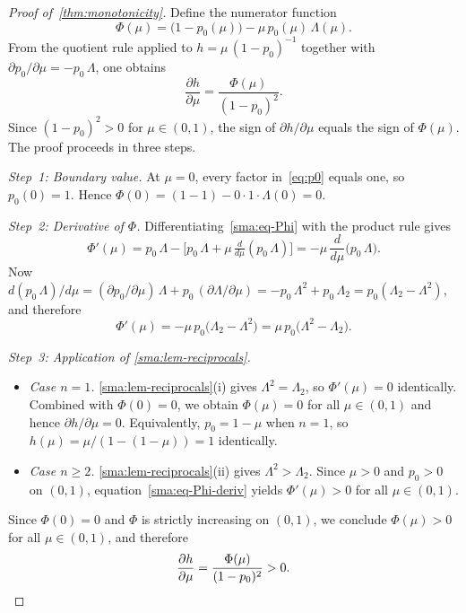 \begin{proof}[Proof of~\cref{thm:monotonicity}]
  Define the numerator function
  \begin{equation}\label{sma:eq-Phi}
    \Phi(\mu)
    = \bigl(1 - p_0(\mu)\bigr) - \mu\, p_0(\mu)\,\Lambda(\mu).
  \end{equation}
  From the quotient rule applied to $h = \mu\,(1-p_0)^{-1}$ together with
  $\partial p_0 / \partial\mu = -p_0\, \Lambda$, one obtains
  \begin{equation}\label{sma:eq-dh-numerator}
    \frac{\partial h}{\partial \mu}
    = \frac{\Phi(\mu)}{(1 - p_0)^2}.
  \end{equation}
  Since $(1 - p_0)^2 > 0$ for $\mu \in (0,1)$, the sign of
  $\partial h / \partial\mu$ equals the sign of $\Phi(\mu)$.  The proof
  proceeds in three steps.

  \medskip\noindent\textit{Step~1: Boundary value.}\enspace
  At $\mu = 0$, every factor in~\eqref{eq:p0} equals one, so $p_0(0) = 1$.
  Hence $\Phi(0) = (1 - 1) - 0 \cdot 1 \cdot \Lambda(0) = 0$.

  \medskip\noindent\textit{Step~2: Derivative of\/ $\Phi$.}\enspace
  Differentiating~\eqref{sma:eq-Phi} with the product rule gives
  \[
    \Phi'(\mu)
    = p_0\,\Lambda
      - \bigl[p_0\,\Lambda
        + \mu\,\tfrac{d}{d\mu}(p_0\,\Lambda)\bigr]
    = -\mu\,\frac{d}{d\mu}\bigl(p_0\,\Lambda\bigr).
  \]
  Now $d(p_0\,\Lambda)/d\mu
  = (\partial p_0/\partial\mu)\,\Lambda + p_0\,(\partial\Lambda/\partial\mu)
  = -p_0\,\Lambda^2 + p_0\,\Lambda_2
  = p_0(\Lambda_2 - \Lambda^2)$,
  and therefore
  \begin{equation}\label{sma:eq-Phi-deriv}
    \Phi'(\mu)
    = -\mu\, p_0\bigl(\Lambda_2 - \Lambda^2\bigr)
    = \mu\, p_0\bigl(\Lambda^2 - \Lambda_2\bigr).
  \end{equation}

  \medskip\noindent\textit{Step~3: Application of
  \cref{sma:lem-reciprocals}.}\enspace
  \begin{itemize}[nosep]
    \item \emph{Case $n = 1$.}
      \cref{sma:lem-reciprocals}(i) gives $\Lambda^2 = \Lambda_2$, so
      $\Phi'(\mu) = 0$ identically.  Combined with $\Phi(0) = 0$, we obtain
      $\Phi(\mu) = 0$ for all $\mu \in (0,1)$ and hence
      $\partial h / \partial\mu = 0$.  Equivalently, $p_0 = 1 - \mu$ when
      $n = 1$, so $h(\mu) = \mu / (1 - (1 - \mu)) = 1$ identically.
    \item \emph{Case $n \ge 2$.}
      \cref{sma:lem-reciprocals}(ii) gives $\Lambda^2 > \Lambda_2$.
      Since $\mu > 0$ and $p_0 > 0$ on $(0,1)$,
      equation~\eqref{sma:eq-Phi-deriv} yields $\Phi'(\mu) > 0$ for all
      $\mu \in (0,1)$.
  \end{itemize}
  Since $\Phi(0) = 0$ and $\Phi$ is strictly increasing on $(0,1)$, we
  conclude $\Phi(\mu) > 0$ for all $\mu \in (0,1)$, and therefore
  \[
    \frac{\partial h}{\partial\mu}
    = \frac{\Phi(\mu)}{(1 - p_0)^2} > 0. \qedhere
  \]
\end{proof}

